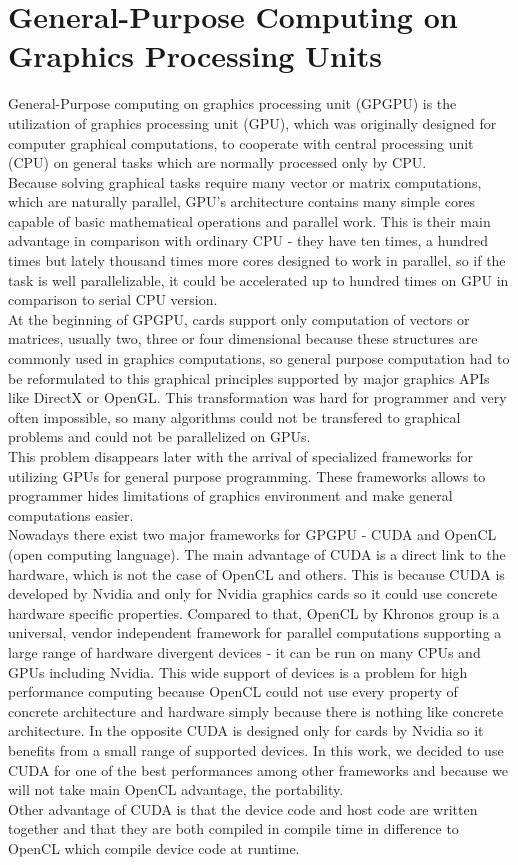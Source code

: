 \chapter{General-Purpose Computing on Graphics Processing Units}
General-Purpose computing on graphics processing unit (GPGPU) is the utilization of graphics processing unit (GPU), which was originally designed for computer graphical computations, to cooperate with central processing unit (CPU) on general tasks which are normally processed only by CPU.\\
Because solving graphical tasks require many vector or matrix computations, which are naturally parallel, GPU's architecture contains many simple cores capable of basic mathematical operations and parallel work. This is their main advantage in comparison with ordinary CPU - they have ten times, a hundred times but lately thousand times more cores designed to work in parallel, so if the task is well parallelizable, it could be accelerated up to hundred times on GPU in comparison to serial CPU version.\\
At the beginning of GPGPU, cards support only computation of vectors or matrices, usually two, three or four dimensional because these structures are commonly used in graphics computations, so general purpose computation had to be reformulated to this graphical principles supported by major graphics APIs like DirectX or OpenGL. This transformation was hard for programmer and very often impossible, so many algorithms could not be transfered to graphical problems and could not be parallelized on GPUs.\\
This problem disappears later with the arrival of specialized frameworks for utilizing GPUs for general purpose programming. These frameworks allows to programmer hides limitations of graphics environment and make general computations easier.\\
Nowadays there exist two major frameworks for GPGPU - CUDA and OpenCL (open computing language). The main advantage of CUDA is a direct link to the hardware, which is not the case of OpenCL and others. This is because CUDA is developed by Nvidia and only for Nvidia graphics cards so it could use concrete hardware specific properties. Compared to that, OpenCL by Khronos group is a universal, vendor independent framework for parallel computations supporting a large range of hardware divergent devices - it can be run on many CPUs and GPUs including Nvidia. This wide support of devices is a problem for high performance computing because OpenCL could not use every property of concrete architecture and hardware simply because there is nothing like concrete architecture. In the opposite CUDA is designed only for cards by Nvidia so it benefits from a small range of supported devices. In this work, we decided to use CUDA for one of the best performances among other frameworks and because we will not take main OpenCL advantage, the portability.\\
Other advantage of CUDA is that the device code and host code are written together and that they are both compiled in compile time in difference to OpenCL which compile device code at runtime.

